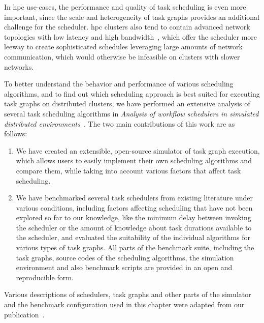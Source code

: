 In \gls{hpc} use-cases, the performance and quality of task scheduling is even more
important, since the scale and heterogeneity of task graphs provides an additional challenge for
the scheduler. \gls{hpc} clusters also tend to contain advanced network topologies
with low latency and high bandwidth~\cite{dragonfly,slimfly}, which offer the scheduler more leeway
to create sophisticated schedules leveraging large amounts of network communication, which would
otherwise be infeasible on clusters with slower networks.

To better understand the behavior and performance of various scheduling algorithms, and to find out
which scheduling approach is best suited for executing task graphs on distributed clusters, we have
performed an extensive analysis of several task scheduling algorithms in
\emph{Analysis of workflow schedulers in simulated distributed environments}~\cite{estee}. The two main contributions of this work are as
follows:
\begin{enumerate}[itemsep=0pt]
	\item We have created an extensible, open-source simulator of task graph execution, which allows users to
	      easily implement their own scheduling algorithms and compare them, while taking into account
	      various factors that affect task scheduling.
	\item We have benchmarked several task schedulers from existing literature under various conditions,
	      including factors affecting scheduling that have not been explored so far to our knowledge, like
	      the minimum delay between invoking the scheduler or the amount of knowledge about task durations
	      available to the scheduler, and evaluated the suitability of the individual algorithms for various
	      types of task graphs. All parts of the benchmark suite, including the task graphs, source codes of
	      the scheduling algorithms, the simulation environment and also benchmark scripts are provided in an
	      open and reproducible form.
\end{enumerate}

Various descriptions of schedulers, task graphs and other parts of the simulator and the benchmark
configuration used in this chapter were adapted from our publication~\cite{estee}.


